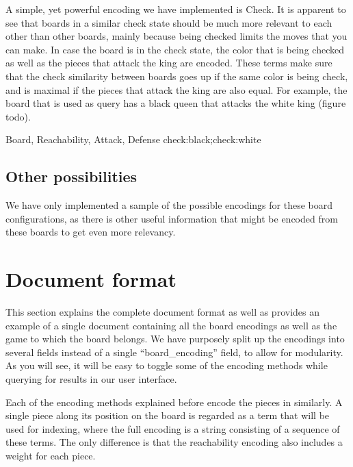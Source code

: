 \documentclass[11pt]{article}
\begin{document}
    A simple, yet powerful encoding we have implemented is Check. It is apparent to see that boards in a similar check state should be much more relevant to each other than other boards, mainly because being checked limits the moves that you can make. In case the board is in the check state, the color that is being checked as well as the pieces that attack the king are encoded. These terms make sure that the check similarity between boards goes up if the same color is being check, and is maximal if the pieces that attack the king are also equal. For example, the board that is used as query has a black queen that attacks the white king (figure todo).

    Board, Reachability, Attack, Defense
    check:black;check:white

    \subsection{Other possibilities}

    We have only implemented a sample of the possible encodings for these board configurations, as there is other useful information that might be encoded from these boards to get even more relevancy.



    \section{Document format}\label{sec:documentformat}


    This section explains the complete document format as well as provides an example of a single document containing all the board encodings as well as the game to which the board belongs. We have purposely split up the encodings into several fields instead of a single ``board\_encoding'' field, to allow for modularity. As you will see, it will be easy to toggle some of the encoding methods while querying for results in our user interface.

    Each of the encoding methods explained before encode the pieces in similarly. A single piece along its position on the board is regarded as a term that will be used for indexing, where the full encoding is a string consisting of a sequence of these terms. The only difference is that the reachability encoding also includes a weight for each piece.
\end{document}
